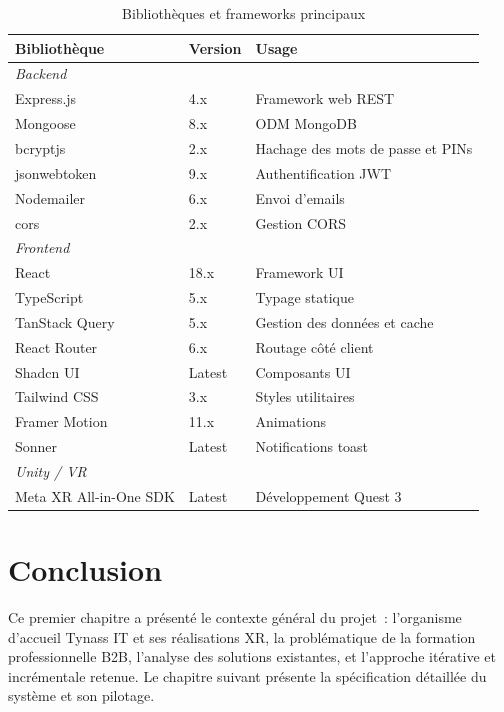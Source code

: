 \begin{table}[H]
  \centering
  \begin{tabularx}{\textwidth}{llX}
    \toprule
    \textbf{Bibliothèque} & \textbf{Version} & \textbf{Usage} \\
    \midrule
    \multicolumn{3}{l}{\textit{Backend}} \\
    Express.js     & 4.x       & Framework web REST \\
    Mongoose       & 8.x       & ODM MongoDB \\
    bcryptjs       & 2.x       & Hachage des mots de passe et PINs \\
    jsonwebtoken   & 9.x       & Authentification JWT \\
    Nodemailer     & 6.x       & Envoi d'emails \\
    cors           & 2.x       & Gestion CORS \\
    \midrule
    \multicolumn{3}{l}{\textit{Frontend}} \\
    React          & 18.x      & Framework UI \\
    TypeScript     & 5.x       & Typage statique \\
    TanStack Query & 5.x       & Gestion des données et cache \\
    React Router   & 6.x       & Routage côté client \\
    Shadcn UI      & Latest    & Composants UI \\
    Tailwind CSS   & 3.x       & Styles utilitaires \\
    Framer Motion  & 11.x      & Animations \\
    Sonner         & Latest    & Notifications toast \\
    \midrule
    \multicolumn{3}{l}{\textit{Unity / VR}} \\
    Meta XR All-in-One SDK & Latest & Développement Quest 3 \\
    \bottomrule
  \end{tabularx}
  \caption{Bibliothèques et frameworks principaux}
  \label{tab:frameworks}
\end{table}

\section{Conclusion}

Ce premier chapitre a présenté le contexte général du projet~: l'organisme d'accueil Tynass IT
et ses réalisations XR, la problématique de la formation professionnelle B2B, l'analyse des
solutions existantes, et l'approche itérative et incrémentale retenue. Le chapitre suivant présente la
spécification détaillée du système et son pilotage.
